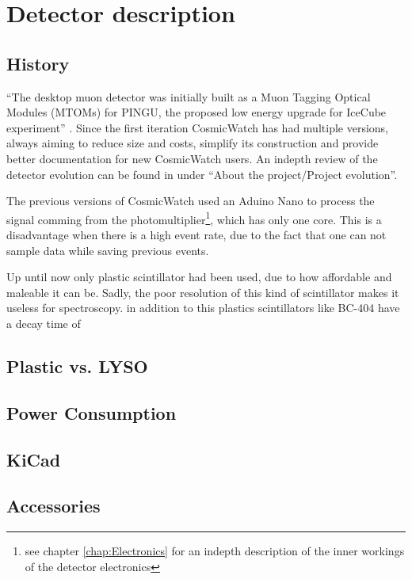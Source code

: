 \chapter{Detector description}

\section{History}

``The desktop muon detector was initially built as a Muon Tagging Optical Modules (MTOMs) for PINGU, the proposed low energy upgrade for IceCube experiment'' \cite{CosmicWatch}. Since the first iteration CosmicWatch has had multiple versions, always aiming to reduce size and costs, simplify its construction and provide better documentation for new CosmicWatch users. An indepth review of the detector evolution can be found in \cite{CosmicWatch} under ``About the project/Project evolution''.

The previous versions of CosmicWatch used an Aduino Nano to process the signal comming from the photomultiplier\footnote{see chapter \ref{chap:Electronics} for an indepth description of the inner workings of the detector electronics}, which has only one core. This is a disadvantage when there is a high event rate, due to the fact that one can not sample data while saving previous events.

Up until now only plastic scintillator had been used, due to how affordable and maleable it can be. Sadly, the poor resolution of this kind of scintillator makes it useless for spectroscopy. in addition to this plastics scintillators like BC-404 have a decay time of  

\section{Plastic vs. LYSO}

\section{Power Consumption}

\section{KiCad}

\section{Accessories}

